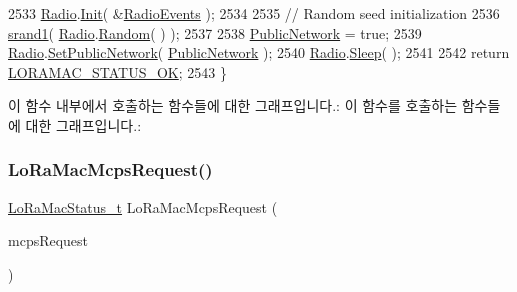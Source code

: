 \begin{DoxyCode}
2533     \mbox{\hyperlink{sx1276mb1las_8c_acf9fe61a72c16fa29a0dc449d23e3820}{Radio}}.\mbox{\hyperlink{struct_radio__s_a976a50280beda4c9dd58b8354affb6b4}{Init}}( &\mbox{\hyperlink{_lo_ra_mac_8c_ab2d43d0043628b27fcec8e64b0e86086}{RadioEvents}} );
2534 
2535     \textcolor{comment}{// Random seed initialization}
2536     \mbox{\hyperlink{utilities_8c_aeb9a45da74fe6c260b78b181882d7275}{srand1}}( \mbox{\hyperlink{sx1276mb1las_8c_acf9fe61a72c16fa29a0dc449d23e3820}{Radio}}.\mbox{\hyperlink{struct_radio__s_a334bf05b91b26c5e6faf6bbf6737eab9}{Random}}( ) );
2537 
2538     \mbox{\hyperlink{_lo_ra_mac_8c_ad5c7c76904042bd86508425be3b91a05}{PublicNetwork}} = \textcolor{keyword}{true};
2539     \mbox{\hyperlink{sx1276mb1las_8c_acf9fe61a72c16fa29a0dc449d23e3820}{Radio}}.\mbox{\hyperlink{struct_radio__s_a2221e3fed07a50bc7437d1204a04a7ec}{SetPublicNetwork}}( \mbox{\hyperlink{_lo_ra_mac_8c_ad5c7c76904042bd86508425be3b91a05}{PublicNetwork}} );
2540     \mbox{\hyperlink{sx1276mb1las_8c_acf9fe61a72c16fa29a0dc449d23e3820}{Radio}}.\mbox{\hyperlink{struct_radio__s_a5792613816e79c465be4169c0bc020cb}{Sleep}}( );
2541 
2542     \textcolor{keywordflow}{return} \mbox{\hyperlink{group___l_o_r_a_m_a_c_gga1d18f26b344040b3ec5c3db662919661a03db5fca052313edb3823c014b653a74}{LORAMAC\_STATUS\_OK}};
2543 \}
\end{DoxyCode}
이 함수 내부에서 호출하는 함수들에 대한 그래프입니다.\+:
이 함수를 호출하는 함수들에 대한 그래프입니다.\+:
\mbox{\label{group___l_o_r_a_m_a_c_ga79768f8a3c22aaff84d4dfcc77ad508c}} 
\subsubsection{\texorpdfstring{Lo\+Ra\+Mac\+Mcps\+Request()}{LoRaMacMcpsRequest()}}
{\footnotesize\ttfamily \mbox{\hyperlink{group___l_o_r_a_m_a_c_ga30bd25657e10480f8605ee951b0ecfbd}{Lo\+Ra\+Mac\+Status\+\_\+t}} Lo\+Ra\+Mac\+Mcps\+Request (\begin{DoxyParamCaption}\item[{\mbox{\hyperlink{group___l_o_r_a_m_a_c_ga038e0fe5eecc1fc4e8165eace8e2e683}{Mcps\+Req\+\_\+t}} $\ast$}]{mcps\+Request }\end{DoxyParamCaption})}



